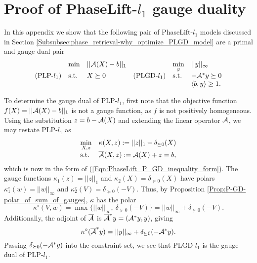 \chapter{Proof of PhaseLift-$l_1$ gauge duality} 	\label{Sec:Appx-PL-l1}

In this appendix we show that the following pair of PhaseLift-$l_1$ models discussed in Section \ref{Subsubsec:phase_retrieval-why_optimize_PLGD_model} are a primal and gauge dual pair
\begin{equation}				\label{Eqn:PhaseLift_l-1_norm_model_gauge_dual}
\begin{array}{llllll}
	&\min
	& ||{\mathcal A}(X) - b||_1
		&&\min\limits_{y}
			&	||y||_\infty
		\\
\textnormal{(PLP-}l_1) &	\textnormal{s.t.}
	&	X \succeq 0
		& \textnormal{(PLGD-}l_1)		
		&	\textnormal{s.t.}
			&	-{\mathcal A}^*y \succeq 0
		\\
	&&&&&	\langle b, y \rangle \geq 1.
\end{array}
\end{equation}

To determine the gauge dual of PLP-$l_1$, first note that the objective function $f(X) = ||{\mathcal A}(X) - b||_1$ is not a gauge function, as $f$ is not positively homogeneous.  Using the substitution $z = b - {\mathcal A}(X)$ and extending the linear operator ${\mathcal A}$, we may restate PLP-$l_1$ as
\begin{equation} 		\label{Eqn:PhaseLift_l-1_norm_model_general}
\begin{array}{ll}
\min\limits_{X, z}
	&	\kappa(X, z) := ||z||_1 + \delta_{\succeq 0}(X)
		\\
\textnormal{s.t.}
	&	\overline{{\mathcal A}}(X, z) := {\mathcal A}(X) + z = b,
\end{array}
\end{equation}
which is now in the form of (\ref{Eqn:PhaseLift_P_GD_inequality_form}).  The gauge functions $\kappa_1(z) = ||z||_1$ and $\kappa_2(X) = \delta_{\succeq 0}(X)$ have polars $\kappa_1^\circ(w) = ||w||_\infty$ and $\kappa_2^\circ(V) = \delta_{\succeq 0}(-V)$.  Thus, by Proposition \ref{Prop:P-GD-polar_of_sum_of_gauges}, $\kappa$ has the polar
\begin{equation}
\kappa^\circ(V, w) = \max \{ ||w||_\infty, \ \delta_{\succeq 0}(-V) \} = ||w||_\infty + \delta_{\succeq 0}(-V).
\end{equation}
Additionally, the adjoint of $\overline{{\mathcal A}}$ is $\overline{{\mathcal A}}^*y = ({\mathcal A}^*y, y)$, giving
\begin{equation}
\kappa^\circ(\overline{{\mathcal A}}^*y) = ||y||_\infty + \delta_{\succeq 0}(-{\mathcal A}^*y).
\end{equation}
Passing $\delta_{\succeq 0}(-{\mathcal A}^*y)$ into the constraint set, we see that PLGD-$l_1$ is the gauge dual of PLP-$l_1$.
